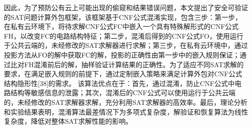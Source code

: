 因此，为了预防公有云上可能出现的偷窥和结果错误问题，本文提出了安全可验证的SAT问题计算外包框架，该框架基于CNF公式混淆实现，包含三步：第一步，在私有云环境下，将待求解CNF公式FC中嵌入一个具有特殊解形式的CNF公式FH，以改变FC的电路结构特征；第二步，混淆后得到的CNF公式FO，使用运行于公共云端的，未经修改的SAT求解器进行求解；第三步，在私有云环境中，通过投影方法从FO的解中获取FC的解，投影的正确性由第一步中的嵌入规则保证；通过比对FH混淆前后的解，抽样验证计算结果的正确性。为了适应不同SAT求解的要求，在满足嵌入规则的前提下，通过定制嵌入策略来满足计算外包对CNF公式结构隐形性[38]的需求。
该算法优点在于：首先，通过混淆，防止CNF公式中电路结构等敏感信息的泄露；其次，混淆后的CNF公式可以使用运行于公共云端的，未经修改的SAT求解器求解，充分利用SAT求解器的高效率。最后，理论分析和实验结果表明，混淆算法最差情况下为多项式复杂度，解验证和恢复算法为线性复杂度，降低对整体SAT求解性能的影响。

